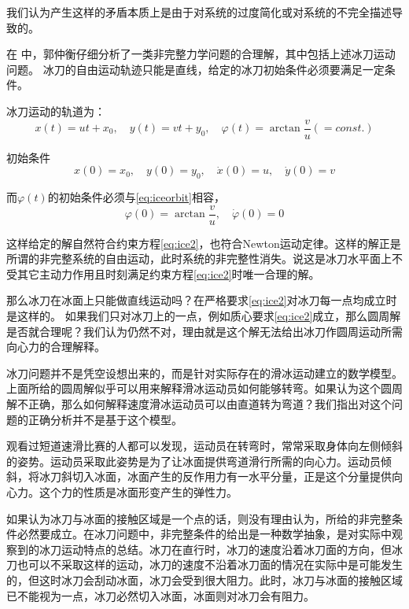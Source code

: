 \documentclass{ctexart}
\begin{document}
我们认为产生这样的矛盾本质上是由于对系统的过度简化或对系统的不完全描述导致的。


在  中，郭仲衡仔细分析了一类非完整力学问题的合理解，其中包括上述冰刀运动问题。
冰刀的自由运动轨迹只能是直线，给定的冰刀初始条件必须要满足一定条件。

冰刀运动的轨道为：
\begin{equation}
  \label{eq:iceorbit}
  x(t) = u t +x_0,\quad y(t) = v t + y_0,\quad \varphi (t) = \arctan \frac{v}{u}(= const.)
\end{equation}

初始条件
\begin{equation}
  \label{eq:initial}
  x(0) = x_0,\quad y(0) = y_0,\quad \dot{x}(0) = u,\quad \dot{y}(0) = v
\end{equation}

而$\varphi(t)$的初始条件必须与\eqref{eq:iceorbit}相容，
\begin{equation}
  \label{eq:initial2}
  \varphi(0) = \arctan \frac{v}{u},\quad \dot{\varphi}(0) = 0
\end{equation}

这样给定的解自然符合约束方程\eqref{eq:ice2}，也符合Newton运动定律。这样的解正是所谓的非完整系统的自由运动，此时系统的非完整性消失。说这是冰刀水平面上不受其它主动力作用且时刻满足约束方程\eqref{eq:ice2}时唯一合理的解。



那么冰刀在冰面上只能做直线运动吗？在严格要求\eqref{eq:ice2}对冰刀每一点均成立时是这样的。
如果我们只对冰刀上的一点，例如质心要求\eqref{eq:ice2}成立，那么圆周解是否就合理呢？我们认为仍然不对，理由就是这个解无法给出冰刀作圆周运动所需向心力的合理解释。

冰刀问题并不是凭空设想出来的，而是针对实际存在的滑冰运动建立的数学模型。上面所给的圆周解似乎可以用来解释滑冰运动员如何能够转弯。如果认为这个圆周解不正确，那么如何解释速度滑冰运动员可以由直道转为弯道？我们指出对这个问题的正确分析并不是基于这个模型。


观看过短道速滑比赛的人都可以发现，运动员在转弯时，常常采取身体向左侧倾斜的姿势。运动员采取此姿势是为了让冰面提供弯道滑行所需的向心力。运动员倾斜，将冰刀斜切入冰面，冰面产生的反作用力有一水平分量，正是这个分量提供向心力。这个力的性质是冰面形变产生的弹性力。


如果认为冰刀与冰面的接触区域是一个点的话，则没有理由认为，所给的非完整条件必然要成立。在冰刀问题中，非完整条件的给出是一种数学抽象，是对实际中观察到的冰刀运动特点的总结。冰刀在直行时，冰刀的速度沿着冰刀面的方向，但冰刀也可以不采取这样的运动，冰刀的速度不沿着冰刀面的情况在实际中是可能发生的，但这时冰刀会刮动冰面，冰刀会受到很大阻力。此时，冰刀与冰面的接触区域已不能视为一点，冰刀必然切入冰面，冰面则对冰刀会有阻力。
\end{document}
